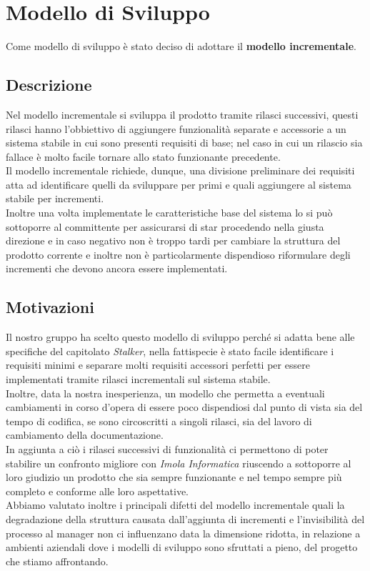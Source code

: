 \section{Modello di Sviluppo}
Come modello di sviluppo è stato deciso di adottare il \textbf{modello incrementale}.
\subsection{Descrizione}
Nel modello incrementale si sviluppa il prodotto tramite rilasci successivi, questi rilasci hanno l'obbiettivo di aggiungere funzionalità separate e accessorie 
a un sistema stabile in cui sono presenti requisiti di base; nel caso in cui un rilascio sia fallace è molto facile tornare allo stato funzionante precedente.\\
Il modello incrementale richiede, dunque, una divisione preliminare dei requisiti atta ad identificare quelli da sviluppare per primi e quali aggiungere al sistema 
stabile per incrementi. \\
Inoltre una volta implementate le caratteristiche base del sistema lo si può sottoporre al committente per assicurarsi di star procedendo nella giusta direzione e in caso negativo
non è troppo tardi per cambiare la struttura del prodotto corrente e inoltre non è particolarmente dispendioso riformulare degli incrementi che devono ancora essere implementati. 

\subsection{Motivazioni}
Il nostro gruppo ha scelto questo modello di sviluppo perché si adatta bene alle specifiche del capitolato \textit{Stalker},
nella fattispecie  è stato facile identificare i requisiti minimi e separare molti requisiti accessori perfetti per essere implementati
tramite rilasci incrementali sul sistema stabile.\\
Inoltre, data la nostra inesperienza, un modello che permetta a eventuali cambiamenti in corso d'opera di essere poco dispendiosi dal punto di vista
sia del tempo di codifica, se sono circoscritti a singoli rilasci, sia del lavoro di cambiamento della documentazione. \\
In aggiunta a ciò i rilasci successivi di funzionalità ci permettono di poter stabilire un confronto migliore con \textit{Imola Informatica}
riuscendo a sottoporre al loro giudizio un prodotto che sia sempre funzionante e nel tempo sempre più completo e conforme alle loro aspettative. \\
Abbiamo valutato inoltre i principali difetti del modello incrementale quali la degradazione della struttura causata dall'aggiunta di 
incrementi e l'invisibilità del processo al manager non ci influenzano data la dimensione ridotta, in relazione a 
ambienti aziendali dove i modelli di sviluppo sono sfruttati a pieno, del progetto che stiamo affrontando.
 
